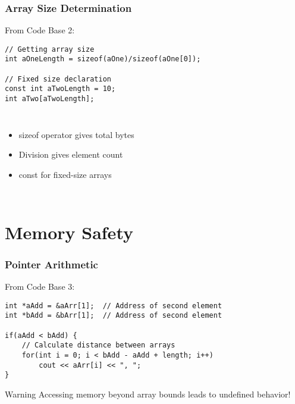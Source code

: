 \documentclass[aspectratio=169]{beamer}
\begin{document}
\begin{frame}[fragile]
    \frametitle{Array Size Determination}
    From Code Base 2:
    \begin{lstlisting}
// Getting array size
int aOneLength = sizeof(aOne)/sizeof(aOne[0]);

// Fixed size declaration
const int aTwoLength = 10;
int aTwo[aTwoLength];
    \end{lstlisting}
    \pause
    \begin{columns}
        \begin{itemize}
            \item sizeof operator gives total bytes
            \item Division gives element count
            \item const for fixed-size arrays
        \end{itemize}
    \end{columns}
\end{frame}

\section{Memory Safety}

\begin{frame}[fragile]
    \frametitle{Pointer Arithmetic}
    From Code Base 3:
    \begin{lstlisting}
int *aAdd = &aArr[1];  // Address of second element
int *bAdd = &bArr[1];  // Address of second element

if(aAdd < bAdd) {
    // Calculate distance between arrays
    for(int i = 0; i < bAdd - aAdd + length; i++)
        cout << aArr[i] << ", ";
}
    \end{lstlisting}
    \pause
    \begin{alertblock}{Warning}
        Accessing memory beyond array bounds leads to undefined behavior!
    \end{alertblock}
\end{frame}
\end{document}
